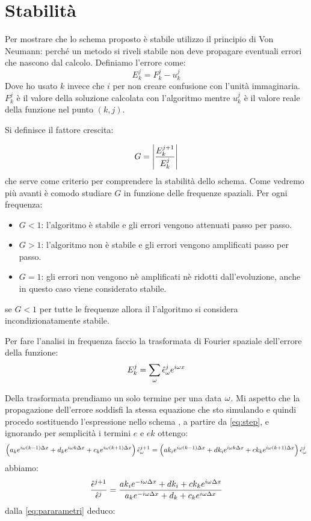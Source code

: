 \section{Stabilit\`a}
Per mostrare che lo schema proposto \`e stabile utilizzo il principio di Von Neumann:
perch\'e un metodo si riveli stabile non deve propagare eventuali errori che nascono dal calcolo. Definiamo l'errore come:
\begin{equation}
  E_k^j = F_k^j-u_k^j
\end{equation}
Dove ho usato $k$ invece che $i$ per non creare confusione con l'unit\`a immaginaria. $F_k^j$ \`e il valore della soluzione calcolata con l'algoritmo mentre $u_k^j$ \`e il valore reale della funzione nel punto $(k,j)$.

Si definisce il fattore  crescita:

\begin{equation}\label{eq:vonNeumannCrescita}
  G = \lr||{\frac{E^{j+1}_k}{E^j_k}}
\end{equation}
che serve come criterio per comprendere la stabilit\`a dello schema.
Come vedremo pi\`u avanti \`e comodo studiare $G$ in funzione delle frequenze spaziali. Per ogni frequenza:
\begin{itemize}
\item $G<1$:	l'algoritmo \`e  stabile e gli errori vengono attenuati passo per passo.
\item $G>1$:	l'algoritmo non \`e  stabile e gli errori vengono amplificati passo per passo.
\item $G=1$:	gli errori non vengono n\`e amplificati n\`e ridotti dall'evoluzione, anche in questo caso viene considerato stabile.
\end{itemize}
se $G<1$ per tutte le frequenze allora il l'algoritmo si considera incondizionatamente stabile.

Per fare l'analisi in frequenza faccio la trasformata di Fourier spaziale dell'errore della funzione:
\begin{equation}
  E_k^j = \sum_{\o} \hat{\epsilon}^j_\o e^{i\o x}
\end{equation}

Della trasformata prendiamo un solo termine per una data $\o$. Mi aspetto che la propagazione dell'errore soddisfi la stessa equazione che sto simulando e quindi procedo sostituendo l'espressione nello schema ,
a partire da \eqref{eq:step}, e ignorando per semplicit\`a i termini $e$ e $ek$ ottengo:
\begin{equation}
  \lrt{a_{k} e^{i\o (k- 1) \Delta x}+d_k e^{i\o k \Delta x} +c_{k}e^{i\o (k+1) \Delta x}} \hat{\epsilon}^{j+1}_\o= 
  \lrt{ak_i e^{i\o (k-1) \Delta x}+ dk_i e^{i\o k \Delta x} + ck_ke^{i\o (k+1) \Delta x}} \hat{\epsilon}^j_\o
\end{equation}
abbiamo:
\begin{equation}
  \frac{\hat{\epsilon}^{j+1}}{\hat{\epsilon}^j}= 
  \frac{ak_i e^{-i\o \Delta x}+ dk_i+ ck_ke^{i\o \Delta x}}{a_{k} e^{-i\o \Delta x}+d_k  +c_{k}e^{i\o\Delta x}}
\end{equation}
dalla \eqref{eq:pararametri} deduco:

